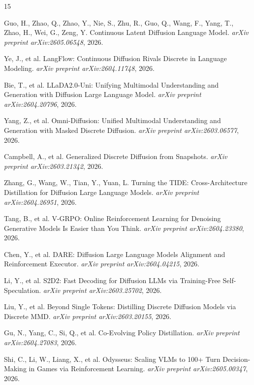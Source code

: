 \documentclass[11pt]{article}
\begin{document}
\begin{thebibliography}{15}

Guo, H., Zhao, Q., Zhao, Y., Nie, S., Zhu, R., Guo, Q., Wang, F., Yang, T., Zhao, H., Wei, G., Zeng, Y.
\newblock Continuous Latent Diffusion Language Model.
\newblock \emph{arXiv preprint arXiv:2605.06548}, 2026.

Ye, J., et al.
\newblock LangFlow: Continuous Diffusion Rivals Discrete in Language Modeling.
\newblock \emph{arXiv preprint arXiv:2604.11748}, 2026.

Bie, T., et al.
\newblock LLaDA2.0-Uni: Unifying Multimodal Understanding and Generation with Diffusion Large Language Model.
\newblock \emph{arXiv preprint arXiv:2604.20796}, 2026.

Yang, Z., et al.
\newblock Omni-Diffusion: Unified Multimodal Understanding and Generation with Masked Discrete Diffusion.
\newblock \emph{arXiv preprint arXiv:2603.06577}, 2026.

Campbell, A., et al.
\newblock Generalized Discrete Diffusion from Snapshots.
\newblock \emph{arXiv preprint arXiv:2603.21342}, 2026.

Zhang, G., Wang, W., Tian, Y., Yuan, L.
\newblock Turning the TIDE: Cross-Architecture Distillation for Diffusion Large Language Models.
\newblock \emph{arXiv preprint arXiv:2604.26951}, 2026.

Tang, B., et al.
\newblock V-GRPO: Online Reinforcement Learning for Denoising Generative Models Is Easier than You Think.
\newblock \emph{arXiv preprint arXiv:2604.23380}, 2026.

Chen, Y., et al.
\newblock DARE: Diffusion Large Language Models Alignment and Reinforcement Executor.
\newblock \emph{arXiv preprint arXiv:2604.04215}, 2026.

Li, Y., et al.
\newblock S2D2: Fast Decoding for Diffusion LLMs via Training-Free Self-Speculation.
\newblock \emph{arXiv preprint arXiv:2603.25702}, 2026.

Liu, Y., et al.
\newblock Beyond Single Tokens: Distilling Discrete Diffusion Models via Discrete MMD.
\newblock \emph{arXiv preprint arXiv:2603.20155}, 2026.

Gu, N., Yang, C., Si, Q., et al.
\newblock Co-Evolving Policy Distillation.
\newblock \emph{arXiv preprint arXiv:2604.27083}, 2026.

Shi, C., Li, W., Liang, X., et al.
\newblock Odysseus: Scaling VLMs to 100+ Turn Decision-Making in Games via Reinforcement Learning.
\newblock \emph{arXiv preprint arXiv:2605.00347}, 2026.


\end{thebibliography}
\end{document}
